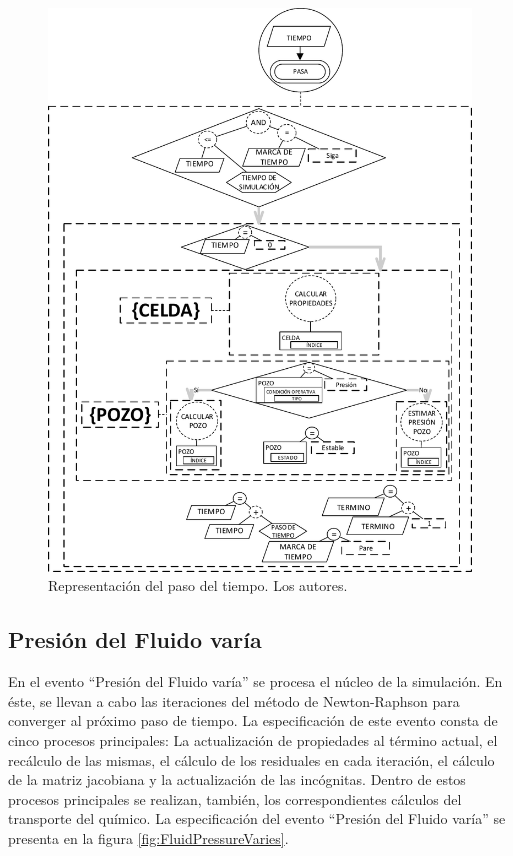 \begin{figure}[h]
	\centering%
	\includegraphics[width=0.7\linewidth]{Fig/TiempoPasa.pdf}%
	\caption[Representación del paso del tiempo.]{Representación del paso del tiempo. Los autores.} \label{fig:TimePasses}
\end{figure}


\subsection{Presión del Fluido varía}\label{sec:PS_FluidVaries}
En el evento ``Presión del Fluido varía'' se procesa el núcleo de la simulación. En éste, se llevan a cabo las iteraciones del método de Newton-Raphson para converger al próximo paso de tiempo. La especificación de este evento consta de cinco procesos principales: La actualización de propiedades al término actual, el recálculo de las mismas, el cálculo de los residuales en cada iteración, el cálculo de la matriz jacobiana y la actualización de las incógnitas. Dentro de estos procesos principales se realizan, también, los correspondientes cálculos del transporte del químico. La especificación del evento ``Presión del Fluido varía'' se presenta en la figura \ref{fig:FluidPressureVaries}.\\

